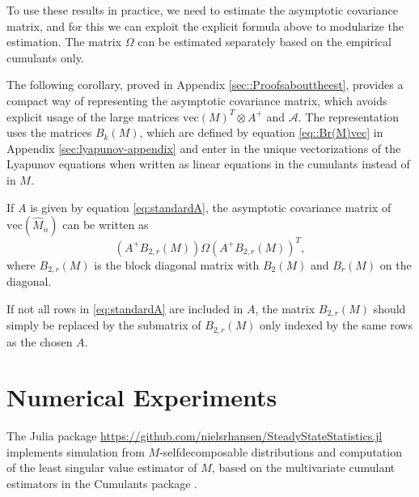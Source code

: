 \documentclass{biometrika}
\begin{document}
To use these results in practice, we need to estimate the asymptotic covariance matrix, and for 
this we can exploit the explicit formula above to modularize the estimation. The matrix 
$\Omega$ can be estimated separately based on the empirical cumulants only. 

The following corollary, proved in Appendix \ref{sec::Proofsabouttheest}, provides 
a compact way of representing the asymptotic covariance matrix, which avoids 
explicit usage of the large matrices $\mathrm{vec}(M)^T \otimes A^{+}$ and $\mathcal{A}$. The representation uses the matrices $B_k(M)$, which are defined by equation \eqref{eq::Br(M)vec} 
in Appendix \ref{sec:lyapunov-appendix} and enter in the unique vectorizations of the 
Lyapunov equations when written as linear equations in the cumulants instead of in $M$. 

\begin{corollary} \label{cor::RewriteAsymptoticCov}
    If $A$ is given by equation \eqref{eq:standardA}, the asymptotic covariance matrix of $\mathrm{vec}(\hat{M}_n)$ can be written as
    \begin{equation*}
        (A^{+} B_{2,r}(M)) \Omega (A^{+} B_{2,r}(M))^{T},
    \end{equation*}
    where $B_{2,r}(M)$ is the block diagonal matrix with $B_2(M)$ and $B_r(M)$ on the diagonal.
\end{corollary}

If not all rows in \eqref{eq:standardA} are included in $A$, the matrix $B_{2,r}(M)$ should simply be replaced 
by the submatrix of $B_{2,r}(M)$ only indexed by the same rows as the chosen $A$. 


\section{Numerical Experiments} \label{sec:numerical_experiments}

The Julia package \url{https://github.com/nielsrhansen/SteadyStateStatistics.jl} 
implements simulation from $M$-selfdecomposable distributions and computation of the 
least singular value estimator of $M$, based on the multivariate cumulant estimators 
in the Cumulants package \citep{Domino:2018}.
\end{document}
